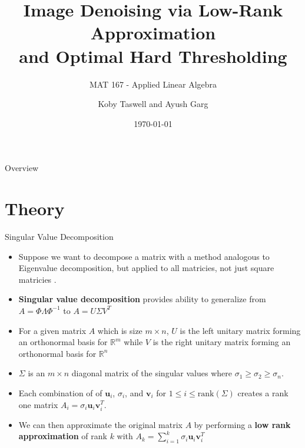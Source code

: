 \documentclass[aspectratio=169,xcolor=dvipsnames]{beamer}
\title[Denoising with SVD]{Image Denoising via Low-Rank Approximation\\ and Optimal Hard Thresholding}
\subtitle{MAT 167 - Applied Linear Algebra}
\author[Taswell and Garg] {Koby Taswell and Ayush Garg}
\institute[UCD] %
{
	University of California, Davis 
	\vskip 3pt
}
\date{\today} %
\renewcommand{\vec}[1]{\mathbf{#1}}
\begin{document}
	
	\begin{frame}
		\titlepage
	\end{frame}
	
	\begin{frame}{Overview}
		\tableofcontents
	\end{frame}
	
	\section{Theory}
	
	\begin{frame}{Singular Value Decomposition}
		\begin{itemize}
			\item Suppose we want to decompose a matrix with a method analogous to Eigenvalue decomposition, but applied to all matricies, not just square matricies \cite{Eckart1936}.
			\item \textbf{Singular value decomposition} provides ability to generalize from $A = \Phi\Lambda\Phi^{-1}$ to $A = U\Sigma V^{T}$
			\item For a given matrix $A$ which is size $m\times n$, $U$ is the left unitary matrix forming an orthonormal basis for $\mathbb{R}^m$  while $V$ is the right unitary matrix forming an orthonormal basis for $\mathbb{R}^n$
			\item $\Sigma$ is an $m\times n$ diagonal matrix of the singular values where $\sigma_1 \geq \sigma_2 \geq \sigma_n$. 
			\item Each combination of of $\vec{u}_i$, $\sigma_i$, and $\vec{v}_i$ for $1\leq i \leq \text{rank}(\Sigma)$ creates a rank one matrix $A_i = \sigma_i\vec{u}_i\vec{v}_i^T$.
			\item We can then approximate the original matrix $A$ by performing a \textbf{low rank approximation} of rank $k$ with $A_k = \sum_{i=1}^{k}  \sigma_i\vec{u}_i\vec{v}_i^T$
		\end{itemize}
	\end{frame}
	
\end{document}
